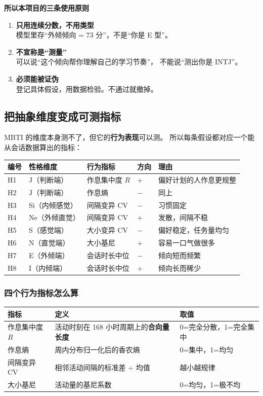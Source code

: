 \documentclass[UTF8,a4paper,11pt]{ctexart}
\newenvironment{explainbox}[1]
{\begin{center}\begin{minipage}{0.94\textwidth}\colorbox{boxbg}{\parbox{0.92\textwidth}{\textbf{#1}\par\vspace{2pt}}}}
{\end{minipage}\end{center}}
\begin{document}
\begin{explainbox}{所以本项目的三条使用原则}
\begin{enumerate}[leftmargin=1.4em,itemsep=2pt]
\item \textbf{只用连续分数，不用类型}\\
      模型里存“外倾倾向 = 73 分”，不是“你是 E 型”。
\item \textbf{不宣称是“测量”}\\
      可以说“这个倾向帮你理解自己的学习节奏”，
      不能说“测出你是 INTJ”。
\item \textbf{必须能被证伪}\\
      登记具体假设，用数据检验。不通过就撤掉。
\end{enumerate}
\end{explainbox}

\subsection{把抽象维度变成可测指标}

MBTI 的维度本身测不了，但它的\textbf{行为表现}可以测。
所以每条假设都对应一个能从会话数据算出的指标：

\begin{longtable}{@{}p{1.0cm}p{2.6cm}p{3.4cm}p{1.4cm}p{5.4cm}@{}}
\toprule
\textbf{编号} & \textbf{性格维度} & \textbf{行为指标} & \textbf{方向} & \textbf{理由} \\
\midrule
H1 & J（判断端） & 作息集中度 $R$ & $+$ & 偏好计划的人作息更规整 \\
H2 & J（判断端） & 作息熵 & $-$ & 同上 \\
H3 & Si（内倾感觉） & 间隔变异 CV & $-$ & 习惯固定 \\
H4 & Ne（外倾直觉） & 间隔变异 CV & $+$ & 发散，间隔不稳 \\
H5 & S（感觉端） & 大小变异 CV & $-$ & 偏好稳定，任务量均匀 \\
H6 & N（直觉端） & 大小基尼 & $+$ & 容易一口气做很多 \\
H7 & E（外倾端） & 会话时长中位 & $-$ & 倾向短而频繁 \\
H8 & I（内倾端） & 会话时长中位 & $+$ & 倾向长而稀少 \\
\bottomrule
\end{longtable}

\subsubsection{四个行为指标怎么算}

\begin{longtable}{@{}p{3.4cm}p{6.6cm}p{3.8cm}@{}}
\toprule
\textbf{指标} & \textbf{定义} & \textbf{取值} \\
\midrule
作息集中度 $R$ & 活动时刻在 168 小时周期上的\textbf{合向量长度} & 0=完全分散，1=完全集中 \\
作息熵 & 周内分布归一化后的香农熵 & 0=集中，1=均匀 \\
间隔变异 CV & 相邻活动间隔的标准差 $\div$ 均值 & 越小越规律 \\
大小基尼 & 活动量的基尼系数 & 0=均匀，1=极不均 \\
\bottomrule
\end{longtable}
\end{document}
